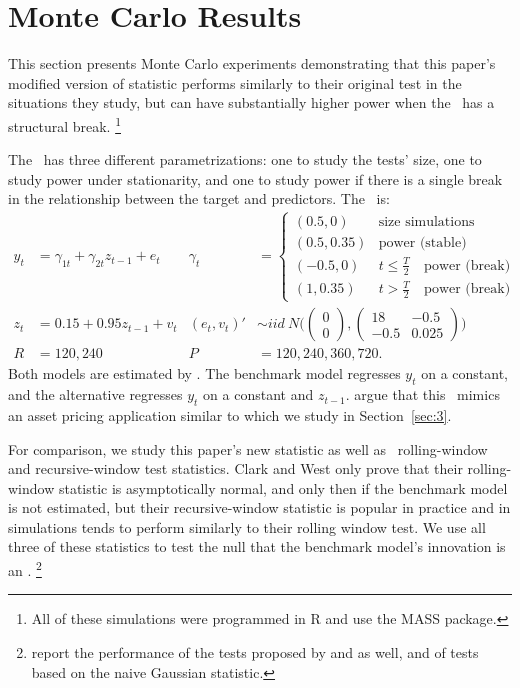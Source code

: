 \documentclass[12pt,fleqn]{article}
\begin{document}
\section{Monte Carlo Results}\label{sec:2}
This section presents Monte Carlo experiments demonstrating that
this paper's modified version of  statistic performs
similarly to their original test in the situations they study, but can
have substantially higher power when the \dgp\ has a structural
break.%
\footnote{All of these simulations were programmed in R
  \citep[version 2.14.0]{R} and use the MASS
  \citep[7.3-22]{VeR:02} package.} %

The \dgp\ has three different parametrizations: one to study the
tests' size, one to study power under stationarity, and one to study
power if there is a single break in the relationship between the
target and predictors.  The \dgp\ is:
\begin{align*}
  y_t &= \gamma_{1t} + \gamma_{2t} z_{t-1} + e_t &
  \gamma_t &=
  \begin{cases}
    (0.5, 0)    & \text{size simulations} \\
    (0.5, 0.35) & \text{power (stable)} \\
    (-0.5, 0)    & t \leq \tfrac{T}{2} \quad \text{power (break)} \\
    (1, 0.35) & t > \tfrac{T}{2} \quad \text{power (break)}
  \end{cases}\\\nonumber
  z_t &= 0.15 + 0.95 z_{t-1} + v_t &
  (e_t, v_t)' &\sim iid\ N\Bigg(\begin{pmatrix} 0 \\ 0
  \end{pmatrix}
   , \begin{pmatrix} 18 & -
    0.5 \\ -0.5 & 0.025 \end{pmatrix}\Bigg)
  \\ R &= 120, 240 & P &= 120, 240, 360, 720.
\end{align*}
Both models are estimated by \ols. The benchmark model regresses $y_t$
on a constant, and the alternative regresses $y_t$ on a constant and
$z_{t-1}$.  \citet{ClW:07} argue that this \dgp\ mimics an asset
pricing application similar to  which we study in
Section~\ref{sec:3}.

For comparison, we study this paper's new statistic as well as \poscw\
rolling-window and recursive-window test statistics.  Clark and West
only prove that their rolling-window statistic is asymptotically
normal, and only then if the benchmark model is not estimated, but
their recursive-window statistic is popular in practice and in
simulations tends to perform similarly to their rolling window test.
We use all three of these statistics to test the null that the
benchmark model's innovation is an \mds.%
\footnote{\citet{ClW:07}
  report the performance of the tests proposed by \citet{CCS:01} and
  \citet{ClM:05} as well, and of tests based on the naive Gaussian
  statistic.} %
\end{document}
